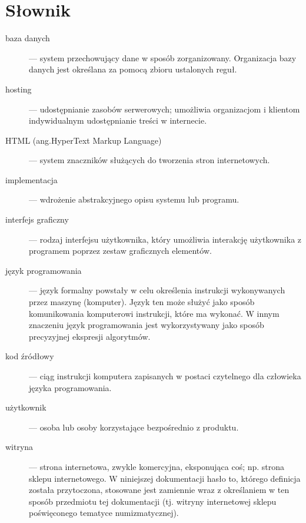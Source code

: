 \documentclass [11pt, a4paper, leqno]	{article}	%
\begin{document}
\section{Słownik}
\begin{description}

 \item[baza danych] --- system przechowujący dane w sposób zorganizowany. Organizacja bazy danych jest określana za pomocą zbioru ustalonych reguł. 

\item[hosting] --- udostępnianie zasobów serwerowych; umożliwia organizacjom i klientom indywidualnym udostępnianie treści w internecie.

\item[HTML (ang.HyperText Markup Language)] ---  system znaczników służących do tworzenia stron internetowych.

\item[implementacja] --- wdrożenie abstrakcyjnego opisu systemu lub programu.

\item[interfejs graficzny] --- rodzaj interfejsu użytkownika, który umożliwia interakcję użytkownika z programem poprzez zestaw graficznych elementów.

\item[język programowania] --- język formalny powstały w celu określenia instrukcji wykonywanych przez maszynę (komputer). 
Język ten może służyć jako sposób komunikowania komputerowi instrukcji, które ma wykonać. W innym znaczeniu język programowania jest wykorzystywany jako sposób precyzyjnej ekspresji algorytmów.

\item[kod źródłowy] --- ciąg instrukcji komputera zapisanych w postaci czytelnego dla człowieka języka programowania. 

\item[użytkownik] --- osoba lub osoby korzystające bezpośrednio z produktu.

\item[witryna] --- strona internetowa, zwykle komercyjna, eksponująca coś; np. strona sklepu internetowego. W niniejszej dokumentacji hasło to, którego definicja została przytoczona, stosowane jest zamiennie wraz z określaniem w ten sposób przedmiotu tej dokumentacji (tj. witryny internetowej sklepu poświęconego tematyce numizmatycznej).


\end{description}
\end{document}

